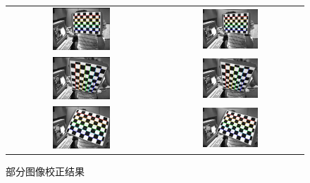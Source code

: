 \documentclass[a4paper, 12pt, UTF8]{article}
\begin{document}
\begin{figure}[ht!]
    \centering
    \begin{tabular}{cc}
        \includegraphics[width=0.4\textwidth]{output/left01_chess.png} &
        \includegraphics[width=0.4\textwidth]{output/left01_chess_undistorted.png} \\
        \includegraphics[width=0.4\textwidth]{output/left02_chess.png} &
        \includegraphics[width=0.4\textwidth]{output/left02_chess_undistorted.png} \\
        \includegraphics[width=0.4\textwidth]{output/left03_chess.png} &
        \includegraphics[width=0.4\textwidth]{output/left03_chess_undistorted.png}
    \end{tabular}
    \caption{部分图像校正结果}
    \label{figure_demo}
\end{figure}
\end{document}
